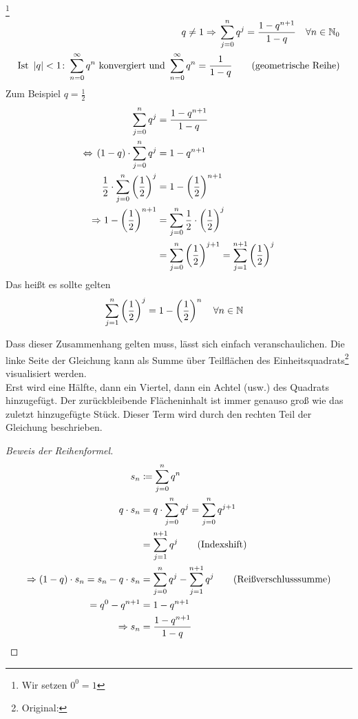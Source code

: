 \begin{beispiel}
    \footnote{Wir setzen $0^0 = 1$}
    \begin{align*}
        q\neq 1 \Rightarrow{} \sum_{j=0}^{n} q^j = \frac{1-q^{n+1}}{1-q}\quad\forall n\in\mathbb{N}_0\\
        \text{Ist } \left\lvert q\right\rvert < 1\colon \sum_{n=0}^{\infty} q^n\text{ konvergiert und } \sum_{n=0}^{\infty} q^n = \frac{1}{1-q}\tag{geometrische Reihe}
    \end{align*}
    Zum Beispiel $q=\frac{1}{2}$
    \begin{align*}
        \sum_{j=0}^{n} q^j &= \frac{1-q^{n+1}}{1-q}\\
        \Leftrightarrow{} \left(1-q\right)\cdot \sum_{j=0}^{n} q^j &= 1-q^{n+1}\\
        \frac{1}{2}\cdot\sum_{j=0}^{n} \left(\frac{1}{2}\right)^j &= 1 - \left(\frac{1}{2}\right)^{n+1}\\
        \Rightarrow{} 1 - \left(\frac{1}{2}\right)^{n+1} &= \sum_{j=0}^{n} \frac{1}{2}\cdot\left(\frac{1}{2}\right)^j\\
        &= \sum_{j=0}^{n} \left(\frac{1}{2}\right)^{j+1} = \sum_{j=1}^{n+1} \left(\frac{1}{2}\right)^j
    \end{align*}
    Das heißt es sollte gelten
    \begin{align*}
        \sum_{j=1}^{n} \left(\frac{1}{2}\right)^j &= 1-\left(\frac{1}{2}\right)^n\quad \forall n\in\mathbb{N}
    \end{align*}

    \noindent Dass dieser Zusammenhang gelten muss, lässt sich einfach veranschaulichen. Die linke Seite der Gleichung kann als Summe über Teilflächen des Einheitsquadrats\footnote{Original: } visualisiert werden.\\
    Erst wird eine Hälfte, dann ein Viertel, dann ein Achtel (usw.) des Quadrats hinzugefügt. Der zurückbleibende Flächeninhalt ist immer genauso groß wie das zuletzt hinzugefügte Stück. Dieser Term wird durch den rechten Teil der Gleichung beschrieben.

    \begin{proof}[Beweis der Reihenformel]
        \begin{align*}
            s_n &\coloneqq \sum_{j=0}^{n} q^n\\
            q\cdot s_n &= q\cdot \sum_{j=0}^{n} q^j = \sum_{j=0}^{n} q^{j+1}\\
            &= \sum_{j=1}^{n+1} q^j\tag{Indexshift}\\
            \Rightarrow{} (1-q)\cdot s_n = s_n - q\cdot s_n &= \sum_{j=0}^{n}  q^j - \sum_{j=1}^{n+1} q^j\tag{Reißverschlusssumme}\\
            = q^0 - q^{n+1} &= 1 - q^{n+1}\\
            \Rightarrow{} s_n &= \frac{1-q^{n+1}}{1-q}\qedhere
        \end{align*}
    \end{proof}


\end{beispiel}
